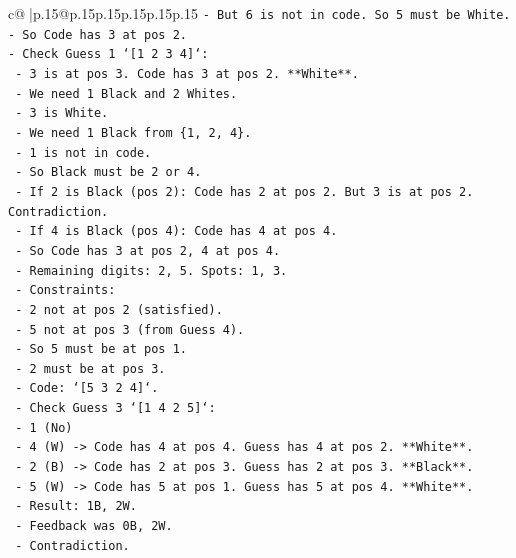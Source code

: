 \documentclass{article}
\begin{document}
{\begin{supertabular}{c@{$\;$}|p{.15\linewidth}@{}p{.15\linewidth}p{.15\linewidth}p{.15\linewidth}p{.15\linewidth}p{.15\linewidth}}
{{{\texttt{{-}   But 6 is not in code. So 5 must be White.} \\
\texttt{{-}   So Code has 3 at pos 2.} \\
\texttt{{-}   Check Guess 1 `{[}1 2 3 4{]}`:} \\
\texttt{    {-}   3 is at pos 3. Code has 3 at pos 2. **White**.} \\
\texttt{    {-}   We need 1 Black and 2 Whites.} \\
\texttt{    {-}   3 is White.} \\
\texttt{    {-}   We need 1 Black from \{1, 2, 4\}.} \\
\texttt{    {-}   1 is not in code.} \\
\texttt{    {-}   So Black must be 2 or 4.} \\
\texttt{    {-}   If 2 is Black (pos 2): Code has 2 at pos 2. But 3 is at pos 2. Contradiction.} \\
\texttt{    {-}   If 4 is Black (pos 4): Code has 4 at pos 4.} \\
\texttt{    {-}   So Code has 3 at pos 2, 4 at pos 4.} \\
\texttt{    {-}   Remaining digits: 2, 5. Spots: 1, 3.} \\
\texttt{    {-}   Constraints:} \\
\texttt{        {-}   2 not at pos 2 (satisfied).} \\
\texttt{        {-}   5 not at pos 3 (from Guess 4).} \\
\texttt{        {-}   So 5 must be at pos 1.} \\
\texttt{        {-}   2 must be at pos 3.} \\
\texttt{    {-}   Code: `{[}5 3 2 4{]}`.} \\
\texttt{    {-}   Check Guess 3 `{[}1 4 2 5{]}`:} \\
\texttt{        {-}   1 (No)} \\
\texttt{        {-}   4 (W) {-}> Code has 4 at pos 4. Guess has 4 at pos 2. **White**.} \\
\texttt{        {-}   2 (B) {-}> Code has 2 at pos 3. Guess has 2 at pos 3. **Black**.} \\
\texttt{        {-}   5 (W) {-}> Code has 5 at pos 1. Guess has 5 at pos 4. **White**.} \\
\texttt{        {-}   Result: 1B, 2W.} \\
\texttt{        {-}   Feedback was 0B, 2W.} \\
\texttt{        {-}   Contradiction.} \\
\\ 
}}}
\end{supertabular}}
\end{document}
